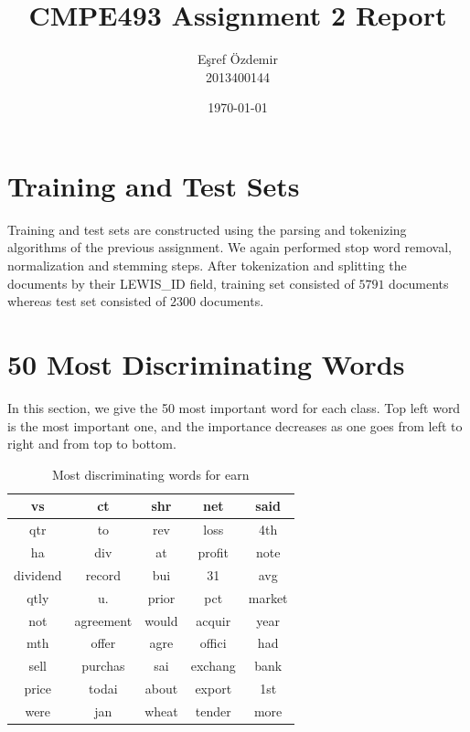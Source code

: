 \documentclass{article}
\title{CMPE493 Assignment 2 Report}
\author{Eşref Özdemir\\
    2013400144
}
\date{\today}
\begin{document}
\maketitle
\tableofcontents
\newpage

\section{Training and Test Sets}
Training and test sets are constructed using the parsing and tokenizing
algorithms of the previous assignment. We again performed stop word removal,
normalization and stemming steps. After tokenization and splitting the documents
by their LEWIS\_ID field, training set consisted of $5791$ documents whereas
test set consisted of $2300$ documents.

\section{50 Most Discriminating Words}
In this section, we give the 50 most important word for each class. Top left
word is the most important one, and the importance decreases as one goes from
left to right and from top to bottom.

\begin{table}[H]
	\caption{Most discriminating words for earn}
	\centering
	\begin{tabular}{|c|c|c|c|c|}
		\hline
		vs & ct & shr & net & said \\
		\hline
		qtr & to & rev & loss & 4th \\
		\hline
		ha & div & at & profit & note \\
		\hline
		dividend & record & bui & 31 & avg \\
		\hline
		qtly & u. & prior & pct & market \\
		\hline
		not & agreement & would & acquir & year \\
		\hline
		mth & offer & agre & offici & had \\
		\hline
		sell & purchas & sai & exchang & bank \\
		\hline
		price & todai & about & export & 1st \\
		\hline
		were & jan & wheat & tender & more \\
		\hline
	\end{tabular}
\end{table}
\end{document}
